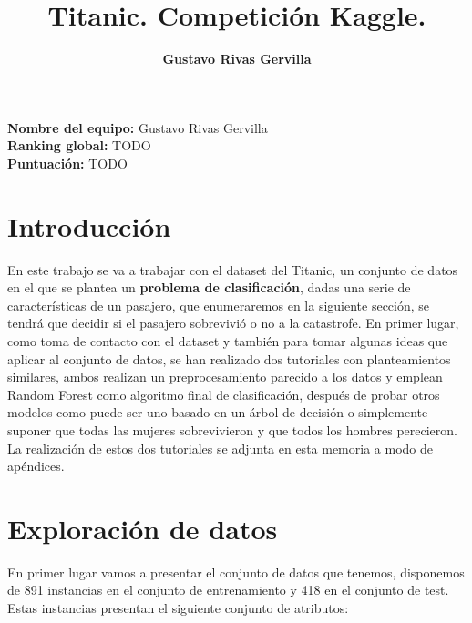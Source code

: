 \documentclass[10pt,a4paper]{article}
\author{\textbf{Gustavo Rivas Gervilla}}
\title{\textcolor{deepblue}{\textbf{Titanic. Competición Kaggle.}}}
\date{}
\begin{document}
\maketitle

\begin{center}
  \textbf{Nombre del equipo: }Gustavo Rivas Gervilla\\
  \textbf{Ranking global: }TODO\\
  \textbf{Puntuación: }TODO
\end{center}

\newpage

\tableofcontents

\newpage

\section{Introducción}

En este trabajo se va a trabajar con el dataset del Titanic, un conjunto de datos en el que se plantea un \textbf{problema de clasificación}, dadas una serie de características de un pasajero, que enumeraremos en la siguiente sección, se tendrá que decidir si el pasajero sobrevivió o no a la catastrofe. En primer lugar, como toma de contacto con el dataset y también para tomar algunas ideas que aplicar al conjunto de datos, se han realizado dos tutoriales con planteamientos similares, ambos realizan un preprocesamiento parecido a los datos y emplean Random Forest como algoritmo final de clasificación, después de probar otros modelos como puede ser uno basado en un árbol de decisión o simplemente suponer que todas las mujeres sobrevivieron y que todos los hombres perecieron. La realización de estos dos tutoriales se adjunta en esta memoria a modo de apéndices.\\

\section{Exploración de datos}

En primer lugar vamos a presentar el conjunto de datos que tenemos, disponemos de 891 instancias en el conjunto de entrenamiento y 418 en el conjunto de test. Estas instancias presentan el siguiente conjunto de atributos:
\end{document}
